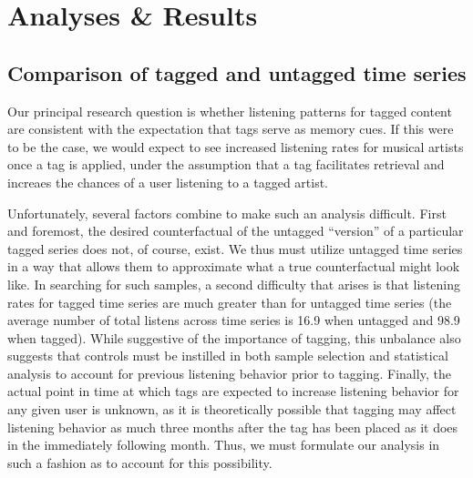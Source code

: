 \section{Analyses \& Results}
\label{sec_analyses}

\subsection{Comparison of tagged and untagged time series}
Our principal research question is whether listening patterns for tagged content are consistent with the expectation that tags serve as memory cues. If this were to be the case, we would expect to see increased listening rates for musical artists once a tag is applied, under the assumption that a tag facilitates retrieval and increaes the chances of a user listening to a tagged artist. 

Unfortunately, several factors combine to make such an analysis difficult.  First and foremost, the desired counterfactual of the untagged ``version'' of a particular tagged series does not, of course, exist. We thus must utilize untagged time series in a way that allows them to approximate what a true counterfactual might look like.  In searching for such samples, a second difficulty that arises is that listening rates for tagged time series are much greater than for untagged time series (the average number of total listens across time series is 16.9  when untagged and 98.9 when tagged). While suggestive of the importance of tagging, this unbalance also suggests that controls must be instilled in both sample selection and statistical analysis to account for previous listening behavior prior to tagging. Finally, the actual point in time at which tags are expected to increase listening behavior for any given user is unknown, as it is theoretically possible that tagging may affect listening behavior as much three months after the tag has been placed as it does in the immediately following month.  Thus, we must formulate our analysis in such a fashion as to account for this possibility.  

